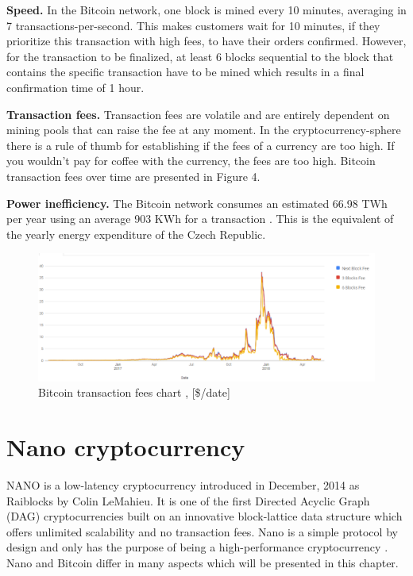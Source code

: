 \documentclass{ferseminar}
\begin{document}
\textbf{Speed.} In the Bitcoin network, one block is mined every 10 minutes, averaging in 7 transactions-per-second. This makes customers wait for 10 minutes, if they prioritize this transaction with high fees, to have their orders confirmed. However, for the transaction to be finalized, at least 6 blocks sequential to the block that contains the specific transaction have to be mined which results in a final confirmation time of 1 hour.

\textbf{Transaction fees.} Transaction fees are volatile and are entirely dependent on mining pools that can raise the fee at any moment. In the cryptocurrency-sphere there is a rule of thumb for establishing if the fees of a currency are too high. If you wouldn't pay for coffee with the currency, the fees are too high. Bitcoin transaction fees over time are presented in Figure 4.

\textbf{Power inefficiency.} The Bitcoin network consumes an estimated 66.98 TWh per year using an average 903 KWh for a transaction \cite{struja}. This is the equivalent of the yearly energy expenditure of the Czech Republic.

\begin{figure}[ht]
	\caption{Bitcoin transaction fees chart \cite{fees}, [\$/date]}
	\includegraphics[scale=0.5]{btcfee}
	\centering
\end{figure}
\FloatBarrier

\section{Nano cryptocurrency}

NANO is a low-latency cryptocurrency introduced in December, 2014 as Raiblocks by Colin LeMahieu. It is one of the first Directed Acyclic Graph (DAG) cryptocurrencies built on an innovative block-lattice data structure which offers unlimited scalability and no transaction fees. Nano is a simple protocol by design and only has the purpose of being a high-performance cryptocurrency \cite{Nano}. Nano and Bitcoin differ in many aspects which will be presented in this chapter.
\end{document}
